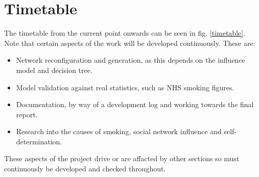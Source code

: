 \documentclass[]{article}
\begin{document}
\section{Timetable}
The timetable from the current point onwards can be seen in fig. \ref{timetable}. Note that certain aspects of the work will
be developed continuously. These are:
\begin{itemize}
\item Network reconfiguration and generation, as this depends on the influence model and decision tree.
\item Model validation against real statistics, such as NHS smoking figures.
\item Documentation, by way of a development log and working towards the final report.
\item Research into the causes of smoking, social network influence and self-determination.
\end{itemize}
These aspects of the project drive or are affacted by other sections so must continuously be developed and checked throughout.
\end{document}
